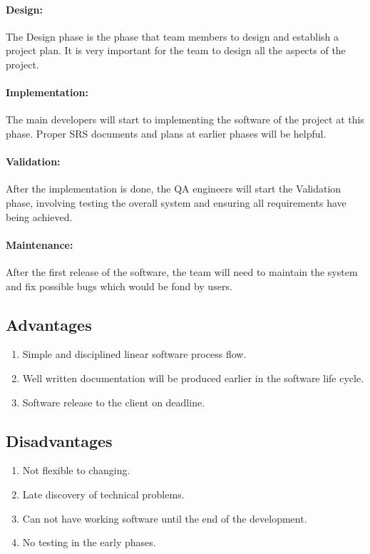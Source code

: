 \documentclass[11pt, a4paper]{report}
\begin{document}
\paragraph{Design:}
The Design phase is the phase that team members to design and establish a project plan. It is very important for the team to design all the aspects of the project.

\paragraph{Implementation:}
The main developers will start to implementing the software of the project at this phase. Proper SRS documents and plans at earlier phases will be helpful. 

\paragraph{Validation:}
After the implementation is done, the QA engineers will start the Validation phase, involving testing the overall system and ensuring all requirements have being achieved. 

\paragraph{Maintenance:}
After the first release of the software, the team will need to maintain the system and fix possible bugs which would be fond by users.

\subsection{Advantages}
\begin{enumerate}
	\item  Simple and disciplined linear software process flow.
	\item  Well written documentation will be produced earlier in the software life cycle.
	\item  Software release to the client on deadline.
\end{enumerate}

\subsection{Disadvantages}
\begin{enumerate}
	\item  Not flexible to changing.
	\item  Late discovery of technical problems.
	\item  Can not have working software until the end of the development.
	\item  No testing in the early phases.
\end{enumerate}
\end{document}
